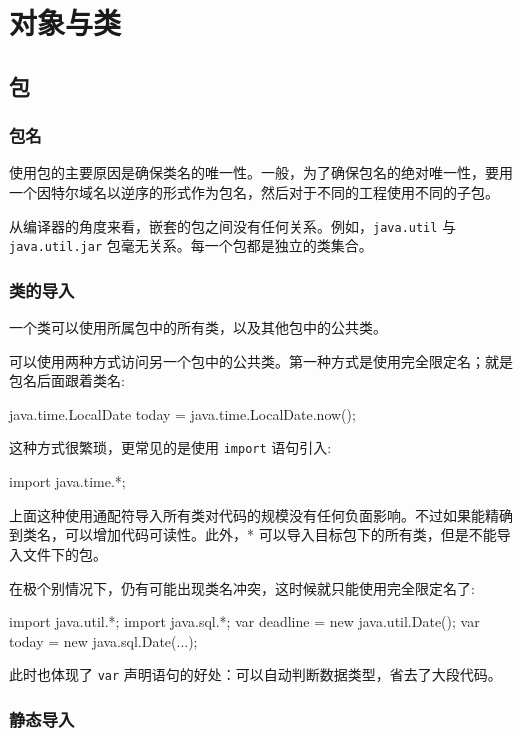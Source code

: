 \section{对象与类}
\subsection{包}
\subsubsection{包名}

使用包的主要原因是确保类名的唯一性。一般，为了确保包名的绝对唯一性，要用一个因特尔域名以逆序的形式作为包名，然后对于不同的工程使用不同的子包。

从编译器的角度来看，嵌套的包之间没有任何关系。例如，\texttt{java.util} 与 \texttt{java.util.jar} 包毫无关系。每一个包都是独立的类集合。

\subsubsection{类的导入}

一个类可以使用所属包中的所有类，以及其他包中的公共类。

可以使用两种方式访问另一个包中的公共类。第一种方式是使用完全限定名；就是包名后面跟着类名:

\begin{Java}
java.time.LocalDate today = java.time.LocalDate.now();
\end{Java}

这种方式很繁琐，更常见的是使用 \texttt{import} 语句引入:

\begin{Java}
import java.time.*;
\end{Java}

上面这种使用通配符导入所有类对代码的规模没有任何负面影响。不过如果能精确到类名，可以增加代码可读性。此外，* 可以导入目标包下的所有类，但是不能导入文件下的包。

在极个别情况下，仍有可能出现类名冲突，这时候就只能使用完全限定名了:

\begin{Java}
import java.util.*;
import java.sql.*;
var deadline = new java.util.Date();
var today = new java.sql.Date(...);
\end{Java}

此时也体现了 \texttt{var} 声明语句的好处：可以自动判断数据类型，省去了大段代码。

\subsubsection{静态导入}

